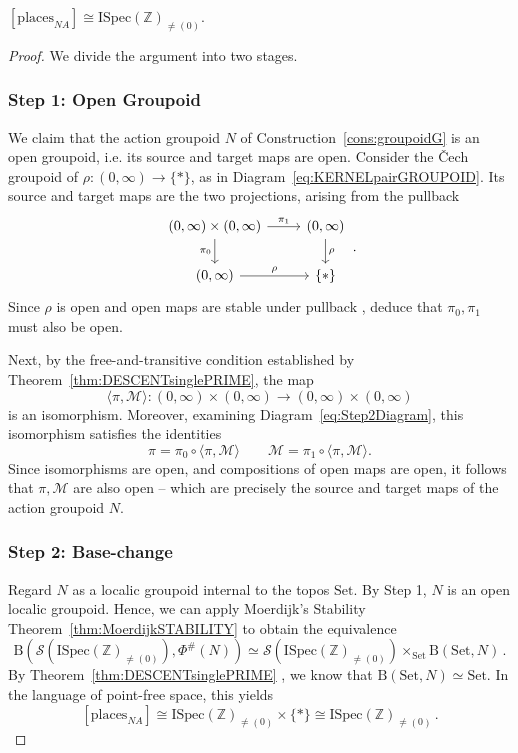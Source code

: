\documentclass[a4paper, 11pt,reqno]{amsart}
\newcommand{\Set}{\mathrm{Set}}
\newcommand{\ISpec}{\mathrm{ISpec}}
\newcommand{\M}{\mathcal{M}}
\newcommand{\baseS}{\mathcal{S}}
\newcommand{\places}{\mathrm{places}}
\newcommand{\Z}{\mathbb{Z}}
\newcommand{\B}{\mathrm{B}}
\newcommand{\lranglet}[2]{\langle#1,#2\rangle}
\begin{document}
\begin{theorem}\label{thm:ALLNAplace} $[\places_{NA}]\cong\ISpec(\mathbb{Z})_{\neq (0)}$.
\end{theorem}
\begin{proof} We divide the argument into two stages.
	
\subsubsection*{Step 1: Open Groupoid} We claim that the action groupoid $N$ of Construction~\ref{cons:groupoidG} is an open groupoid, i.e. its source and target maps are open. Consider the \v{C}ech groupoid of $\rho\colon (0,\infty)\to\{\ast\}$, as in Diagram~\eqref{eq:KERNELpairGROUPOID}. Its source and target maps are the two projections, arising from the pullback
\begin{equation}
\begin{tikzcd}
(0,\infty)\times (0,\infty) \ar[r,"\pi_1"] \ar[d,swap,"\pi_0"] & (0,\infty) \ar[d,"\rho"]\\
(0,\infty) \ar[r,"\rho"]& \{*\} 
\end{tikzcd}\,.
\end{equation}	
Since $\rho$ is open and open maps are stable under pullback \cite[\S V.4]{JoyalTierney}, deduce that $\pi_0,\pi_1$ must also be open. 

Next, by the free-and-transitive condition established by Theorem~\ref{thm:DESCENTsinglePRIME}, the map
$$\lranglet{\pi}{\M}\colon (0,\infty)\times(0,\infty)
\longrightarrow
(0,\infty)\times(0,\infty)$$
is an isomorphism. Moreover, examining Diagram~\eqref{eq:Step2Diagram}, this isomorphism satisfies the identities
$$\pi=\pi_0\circ \lranglet{\pi}{\M}  \qquad \M = \pi_1\circ  \lranglet{\pi}{\M}.$$
Since isomorphisms are open, and compositions of open maps are open, it follows that $\pi,\M$ are also open -- which are precisely the source and target maps of the action groupoid $N$.
	
\subsubsection*{Step 2: Base-change} Regard $N$ as a localic groupoid internal to the topos $\Set$. By Step 1, $N$ is an open localic groupoid. Hence, we can apply Moerdijk's Stability Theorem~\ref{thm:MoerdijkSTABILITY} to obtain the equivalence
$$	\B(\baseS(\ISpec(\mathbb{Z})_{\neq (0)}), \Phi^\#(N))\simeq \baseS(\ISpec(\mathbb{Z})_{\neq (0)})\times_{\Set} \B(\Set,N)\,.$$
	By Theorem~\ref{thm:DESCENTsinglePRIME}	, we know that $\B(\Set,N)\simeq \Set$. In the language of point-free space, this yields
$$	[\places_{NA}]\cong \ISpec(\Z)_{\neq (0)} \times \{\ast\} \cong\ISpec(\Z)_{\neq (0)}\,.$$
\end{proof}
\end{document}
